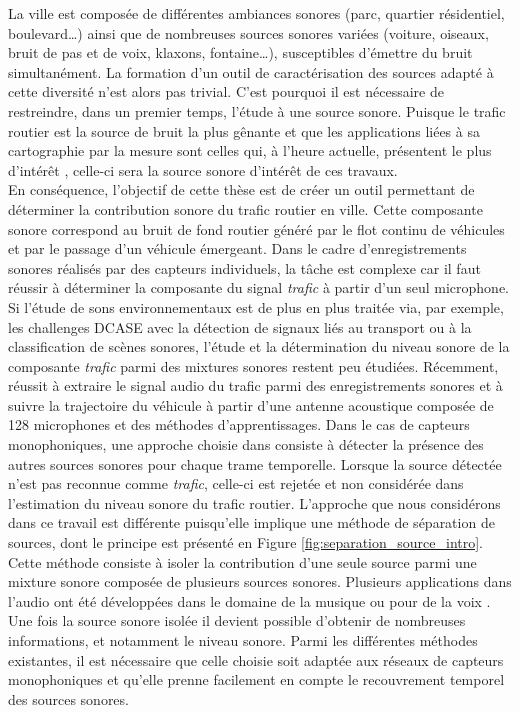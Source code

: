 La ville est composée de différentes ambiances sonores (parc, quartier résidentiel, boulevard\dots{}) ainsi que de nombreuses sources sonores variées (voiture, oiseaux, bruit de pas et de voix, klaxons, fontaine\dots{}), susceptibles d'émettre du bruit simultanément. La formation d'un outil de caractérisation des sources adapté à cette diversité n'est alors pas trivial.
C'est pourquoi il est nécessaire de restreindre, dans un premier temps, l'étude à une source sonore. Puisque le trafic routier est la source de bruit la plus gênante et que les applications liées à sa cartographie par la mesure sont celles qui, à l'heure actuelle, présentent le plus d'intérêt \cite{jagniatinskis2014assessment}, celle-ci sera la source sonore d'intérêt de ces travaux. \\

En conséquence, l'objectif de cette thèse est de créer un outil permettant de déterminer la contribution sonore du trafic routier en ville. Cette composante sonore correspond au bruit de fond routier généré par le flot continu de véhicules et par le passage d'un véhicule émergeant.
Dans le cadre d'enregistrements sonores réalisés par des capteurs individuels, la tâche est complexe car il faut réussir à déterminer la composante du signal \textit{trafic} à partir d'un seul microphone. Si l'étude de sons environnementaux est de plus en plus traitée via, par exemple, les challenges DCASE \cite{stowell2015detection,mesaros2017dcase} avec la détection de signaux liés au transport ou à la classification de scènes sonores, l'étude et la détermination du niveau sonore de la composante \textit{trafic} parmi des mixtures sonores restent peu étudiées. Récemment, \cite{leiba2017large} réussit à extraire le signal audio du trafic parmi des enregistrements sonores et à suivre la trajectoire du véhicule à partir d'une antenne acoustique composée de 128 microphones et des méthodes d'apprentissages.
Dans le cas de capteurs monophoniques, une approche choisie dans \cite{socoro2017anomalous} consiste à détecter la présence des autres sources sonores pour chaque trame temporelle. Lorsque la source détectée n'est pas reconnue comme \textit{trafic}, celle-ci est rejetée et non considérée dans l'estimation du niveau sonore du trafic routier.
L'approche que nous considérons dans ce travail est différente puisqu'elle implique une méthode de séparation de sources, dont le principe est présenté en Figure \ref{fig:separation_source_intro}. Cette méthode consiste à isoler la contribution d'une seule source parmi une mixture sonore composée de plusieurs sources sonores. Plusieurs applications dans l'audio ont été développées dans le domaine de la musique \cite{smaragdis_non-negative_2003,virtanen_monaural_2007} ou pour de la voix \cite{weninger2012supervised,yilmaz2004blind}. Une fois la source sonore isolée il devient possible d'obtenir de nombreuses informations, et notamment le niveau sonore. Parmi les différentes méthodes existantes, il est nécessaire que celle choisie soit adaptée aux réseaux de capteurs monophoniques et qu'elle prenne facilement en compte le recouvrement temporel des sources sonores.

